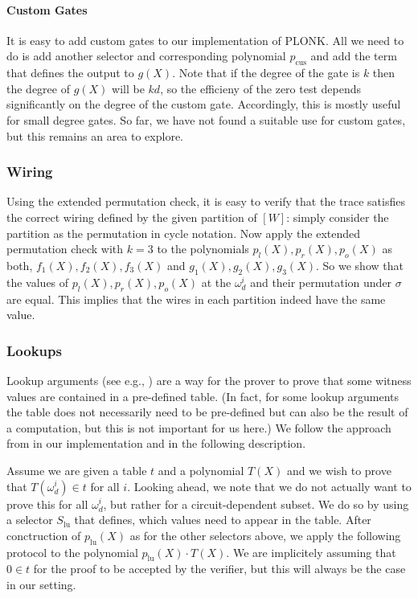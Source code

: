 \documentclass[final]{zamarep}
\newcommand{\Sel}[1]{S_{\mathrm{#1}}}
\newcommand{\psel}[1]{p_{\mathrm{#1}}}
\begin{document}
\paragraph{Custom Gates}
It is easy to add custom gates to our implementation of PLONK. All we need to do is add another selector and corresponding polynomial $\psel{cus}$ and add the term that defines the output to $g(X)$. Note that if the degree of the gate is $k$ then the degree of $g(X)$ will be $kd$, so the efficieny of the zero test depends significantly on the degree of the custom gate. Accordingly, this is mostly useful for small degree gates. So far, we have not found a suitable use for custom gates, but this remains an area to explore. 

\subsubsection{Wiring}
\label{sec:wires}
Using the extended permutation check, it is easy to verify that the trace satisfies the correct wiring defined by the given partition of $[W]$: simply consider the partition as the permutation in cycle notation. Now apply the extended permutation check with $k=3$ to the polynomials $p_l(X), p_r(X), p_o(X) $ as both, $f_1(X), f_2(X), f_3(X)$ and $g_1(X), g_2(X), g_3(X)$. So we show that the values of
$p_l(X), p_r(X), p_o(X)$ at the $\omega_d^i$ and their permutation under $\sigma$ are equal. This implies that the wires in each partition indeed have the same value.

\subsubsection{Lookups}
\label{sec:lookups}
Lookup arguments (see e.g., \cite{EPRINT:PFMBM22,EPRINT:GabWil20,halo2}) are a way for the prover to prove that some witness values are contained in a pre-defined table. (In fact, for some lookup arguments the table does not necessarily need to be pre-defined but can also be the result of a computation, but this is not important for us here.) We follow the approach from \cite{halo2} in our implementation and in the following description.

Assume we are given a table $t$ and a polynomial $T(X)$ and we wish to prove that $T(\omega_d^i) \in t$ for all $i$. Looking ahead, we note that we do not actually want to prove this for all $\omega_d^i$, but rather for a circuit-dependent subset. We do so by using a selector $\Sel{lu}$ that defines, which values need to appear in the table. After conctruction of $\psel{lu}(X)$ as for the other selectors above, we apply the following protocol to the polynomial $\psel{lu}(X) \cdot T(X)$. We are implicitely assuming that $0 \in t$ for the proof to be accepted by the verifier, but this will always be the case in our setting.
\end{document}
